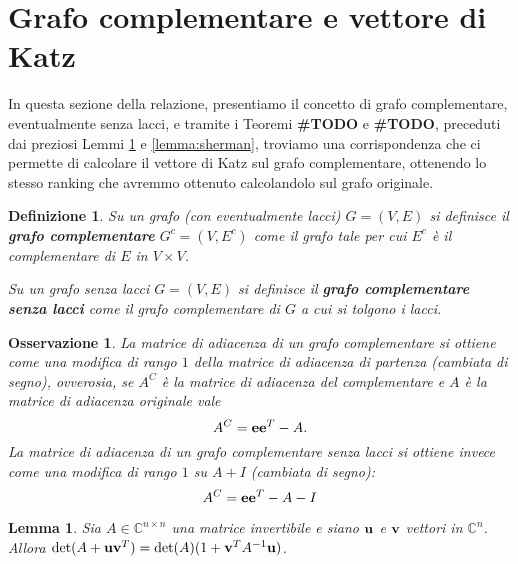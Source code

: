 \documentclass[a4paper]{article}
\newcommand{\CC}{\mathbb{C}}
\newcommand{\evec}{{\bf e}}
\newcommand{\vvec}{{\bf v}}
\newcommand{\uvec}{{\bf u}}
\newtheorem{lemma}{Lemma}
\newtheorem{definition}{Definizione}
\newtheorem{remark}{Osservazione}
\begin{document}
\section{Grafo complementare e vettore di Katz}

In questa sezione della relazione, presentiamo il concetto di grafo
complementare, eventualmente senza lacci, e tramite i Teoremi
\textbf{\#TODO} e \textbf{\#TODO}, preceduti dai preziosi Lemmi
\ref{lemma:matrix_determinant_lemma} e \ref{lemma:sherman},
troviamo una corrispondenza che ci permette di calcolare il vettore di
Katz sul grafo complementare, ottenendo lo stesso ranking che avremmo
ottenuto calcolandolo sul grafo originale.

\begin{definition}
    Su un grafo (con eventualmente lacci) $G = (V, E)$ si definisce il {\rm \textbf{grafo complementare}}
    $G^c = (V, E^c)$ come il grafo tale per cui $E^c$ è il complementare di $E$ in $V \times V$.


    Su un grafo senza lacci $G = (V, E)$ si definisce il {\rm \textbf{grafo complementare senza lacci}} come il grafo complementare di $G$ a cui
    si tolgono i lacci.
\end{definition}

\begin{remark}
    La matrice di adiacenza di un grafo complementare si ottiene come
    una modifica di rango $1$ della matrice di adiacenza di partenza (cambiata di segno), ovverosia, se $A^C$ è la matrice di adiacenza
    del complementare e $A$ è la matrice di adiacenza originale vale
    \[
        A^C = \evec \evec^T - A.
    \]
    La matrice di adiacenza di un grafo complementare senza lacci si
    ottiene invece come una modifica di rango $1$ su $A+I$ (cambiata
    di segno):
    \[
        A^C = \evec \evec^T - A - I
    \]
\end{remark}

\begin{lemma}
    \label{lemma:matrix_determinant_lemma}
    Sia $A \in \CC^{n \times n}$ una matrice invertibile e siano $\uvec$ e $\vvec$ vettori in
    $\CC^n$. Allora $\det(A + \uvec \vvec^T) = \det(A) (1+\vvec^TA^{-1}\uvec)$.
\end{lemma}
\end{document}
